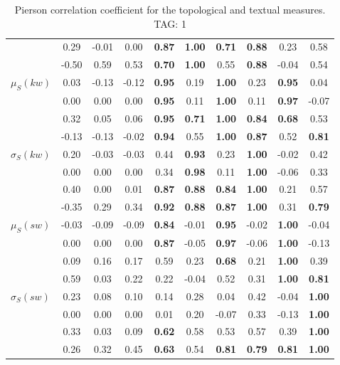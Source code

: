 \begin{table*}[h!]
\begin{center}
\begin{tabular}{| l || c | c | c | c | c | c | c | c | c |}
 & 0.29 & -0.01 & 0.00 & {\bf 0.87} & {\bf 1.00} & {\bf 0.71} & {\bf 0.88} & 0.23 & 0.58 \\
 & -0.50 & 0.59 & 0.53 & {\bf 0.70} & {\bf 1.00} & 0.55 & {\bf 0.88} & -0.04 & 0.54 \\\hline
$\mu_S(kw)$ & 0.03 & -0.13 & -0.12 & {\bf 0.95} & 0.19 & {\bf 1.00} & 0.23 & {\bf 0.95} & 0.04 \\
 & 0.00 & 0.00 & 0.00 & {\bf 0.95} & 0.11 & {\bf 1.00} & 0.11 & {\bf 0.97} & -0.07 \\
 & 0.32 & 0.05 & 0.06 & {\bf 0.95} & {\bf 0.71} & {\bf 1.00} & {\bf 0.84} & {\bf 0.68} & 0.53 \\
 & -0.13 & -0.13 & -0.02 & {\bf 0.94} & 0.55 & {\bf 1.00} & {\bf 0.87} & 0.52 & {\bf 0.81} \\\hline
$\sigma_S(kw)$ & 0.20 & -0.03 & -0.03 & 0.44 & {\bf 0.93} & 0.23 & {\bf 1.00} & -0.02 & 0.42 \\
 & 0.00 & 0.00 & 0.00 & 0.34 & {\bf 0.98} & 0.11 & {\bf 1.00} & -0.06 & 0.33 \\
 & 0.40 & 0.00 & 0.01 & {\bf 0.87} & {\bf 0.88} & {\bf 0.84} & {\bf 1.00} & 0.21 & 0.57 \\
 & -0.35 & 0.29 & 0.34 & {\bf 0.92} & {\bf 0.88} & {\bf 0.87} & {\bf 1.00} & 0.31 & {\bf 0.79} \\\hline
$\mu_S(sw)$ & -0.03 & -0.09 & -0.09 & {\bf 0.84} & -0.01 & {\bf 0.95} & -0.02 & {\bf 1.00} & -0.04 \\
 & 0.00 & 0.00 & 0.00 & {\bf 0.87} & -0.05 & {\bf 0.97} & -0.06 & {\bf 1.00} & -0.13 \\
 & 0.09 & 0.16 & 0.17 & 0.59 & 0.23 & {\bf 0.68} & 0.21 & {\bf 1.00} & 0.39 \\
 & 0.59 & 0.03 & 0.22 & 0.22 & -0.04 & 0.52 & 0.31 & {\bf 1.00} & {\bf 0.81} \\\hline
$\sigma_S(sw)$ & 0.23 & 0.08 & 0.10 & 0.14 & 0.28 & 0.04 & 0.42 & -0.04 & {\bf 1.00} \\
 & 0.00 & 0.00 & 0.00 & 0.01 & 0.20 & -0.07 & 0.33 & -0.13 & {\bf 1.00} \\
 & 0.33 & 0.03 & 0.09 & {\bf 0.62} & 0.58 & 0.53 & 0.57 & 0.39 & {\bf 1.00} \\
 & 0.26 & 0.32 & 0.45 & {\bf 0.63} & 0.54 & {\bf 0.81} & {\bf 0.79} & {\bf 0.81} & {\bf 1.00} \\\hline
\end{tabular}
\caption{Pierson correlation coefficient for the topological and textual measures. TAG: 1}
\end{center}
\end{table*}